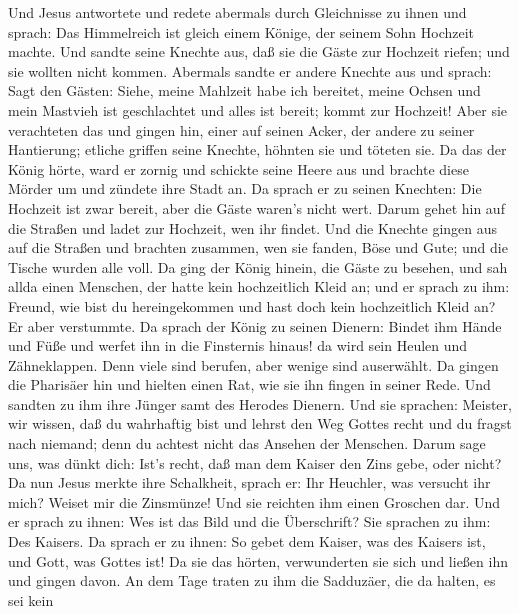  Und Jesus antwortete und redete abermals durch Gleichnisse
zu ihnen und sprach:  Das Himmelreich ist gleich einem
Könige, der seinem Sohn Hochzeit machte.  Und sandte seine
Knechte aus, daß sie die Gäste zur Hochzeit riefen; und sie wollten
nicht kommen.  Abermals sandte er andere Knechte aus und
sprach: Sagt den Gästen: Siehe, meine Mahlzeit habe ich bereitet, meine
Ochsen und mein Mastvieh ist geschlachtet und alles ist bereit; kommt
zur Hochzeit!  Aber sie verachteten das und gingen hin,
einer auf seinen Acker, der andere zu seiner Hantierung; 
etliche griffen seine Knechte, höhnten sie und töteten sie. 
Da das der König hörte, ward er zornig und schickte seine Heere aus und
brachte diese Mörder um und zündete ihre Stadt an.  Da
sprach er zu seinen Knechten: Die Hochzeit ist zwar bereit, aber die
Gäste waren's nicht wert.  Darum gehet hin auf die Straßen
und ladet zur Hochzeit, wen ihr findet.  Und die Knechte
gingen aus auf die Straßen und brachten zusammen, wen sie fanden, Böse
und Gute; und die Tische wurden alle voll.  Da ging der
König hinein, die Gäste zu besehen, und sah allda einen Menschen, der
hatte kein hochzeitlich Kleid an;  und er sprach zu ihm:
Freund, wie bist du hereingekommen und hast doch kein hochzeitlich Kleid
an? Er aber verstummte.  Da sprach der König zu seinen
Dienern: Bindet ihm Hände und Füße und werfet ihn in die Finsternis
hinaus! da wird sein Heulen und Zähneklappen.  Denn viele
sind berufen, aber wenige sind auserwählt.  Da gingen die
Pharisäer hin und hielten einen Rat, wie sie ihn fingen in seiner Rede.
 Und sandten zu ihm ihre Jünger samt des Herodes Dienern.
Und sie sprachen: Meister, wir wissen, daß du wahrhaftig bist und lehrst
den Weg Gottes recht und du fragst nach niemand; denn du achtest nicht
das Ansehen der Menschen.  Darum sage uns, was dünkt dich:
Ist's recht, daß man dem Kaiser den Zins gebe, oder nicht? 
Da nun Jesus merkte ihre Schalkheit, sprach er: Ihr Heuchler, was
versucht ihr mich?  Weiset mir die Zinsmünze! Und sie
reichten ihm einen Groschen dar.  Und er sprach zu ihnen:
Wes ist das Bild und die Überschrift?  Sie sprachen zu ihm:
Des Kaisers. Da sprach er zu ihnen: So gebet dem Kaiser, was des Kaisers
ist, und Gott, was Gottes ist!  Da sie das hörten,
verwunderten sie sich und ließen ihn und gingen davon.  An
dem Tage traten zu ihm die Sadduzäer, die da halten, es sei kein
